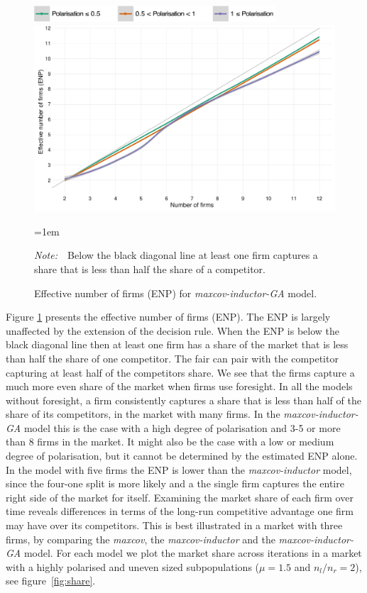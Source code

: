 \documentclass[preprint, 12pt]{elsarticle}
\newcommand{\Figtext}[1]{%
	\begin{tablenotes}[para,flushleft]
		\hangindent=1em
		\footnotesize
		\raggedright
		#1
	\end{tablenotes}
}
\newcommand{\Fignote}[1]{\Figtext{\emph{Note:~}~#1}}
\begin{document}
\begin{figure}[ht!]
	\centering
	\includegraphics[width=90mm]{Graphics/legend_pol.pdf}
	\includegraphics[width=\textwidth]{Graphics/fig622a.pdf}
	\caption{Effective number of firms (ENP) for \emph{maxcov-inductor-GA} model.}
	\label{fig:enp_miga}
	\Fignote{Below the black diagonal line at least one firm captures a share that is less than half the share of a competitor.}
\end{figure}

Figure \ref{fig:enp_miga} presents the effective number of firms (ENP). The ENP is largely unaffected by the extension of the decision rule. When the ENP is below the black diagonal line then at least one firm has a share of the market that is less than half the share of one competitor. The fair can pair with the competitor capturing at least half of the competitors share. We see that the firms capture a much more even share of the market when firms use foresight. In all the models without foresight, a firm consistently captures a share that is less than half of the share of its competitors, in the market with many firms. In the \emph{maxcov-inductor-GA} model this is the case with a high degree of polarisation and 3-5 or more than 8 firms in the market. It might also be the case with a low or medium degree of polarisation, but it cannot be determined by the estimated ENP alone. In the model with five firms the ENP is lower than the \emph{maxcov-inductor} model, since the four-one split is more likely and a the single firm captures the entire right side of the market for itself. Examining the market share of each firm over time reveals differences in terms of the long-run competitive advantage one firm may have over its competitors. This is best illustrated in a market with three firms, by comparing the \emph{maxcov}, the \emph{maxcov-inductor} and the \emph{maxcov-inductor-GA} model. For each model we plot the market share across iterations in a market with a highly polarised and uneven sized subpopulations ($\mu=1.5$ and $n_l/n_r = 2$), see figure~\ref{fig:share}. 
\end{document}
